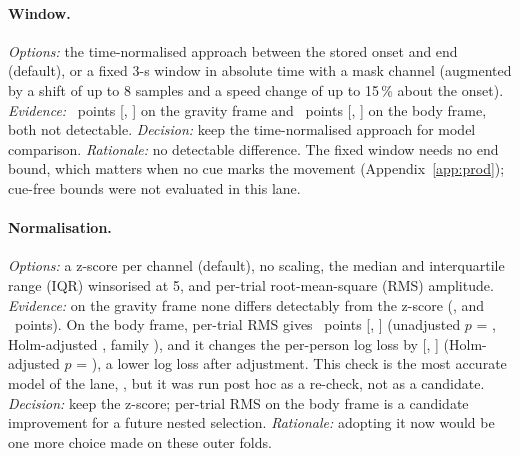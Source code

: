 \paragraph{Window.}
\emph{Options:} the time-normalised approach between the stored onset and end (default), or a fixed 3-s window in absolute time with a mask channel (augmented by a shift of up to 8 samples and a speed change of up to 15\,\% about the onset).
\emph{Evidence:} ~points [, ] on the gravity frame and ~points [, ] on the body frame, both not detectable.
\emph{Decision:} keep the time-normalised approach for model comparison.
\emph{Rationale:} no detectable difference. The fixed window needs no end bound, which matters when no cue marks the movement (Appendix~\ref{app:prod}); cue-free bounds were not evaluated in this lane.

\paragraph{Normalisation.}
\emph{Options:} a z-score per channel (default), no scaling, the median and interquartile range (IQR) winsorised at 5, and per-trial root-mean-square (RMS) amplitude.
\emph{Evidence:} on the gravity frame none differs detectably from the z-score (,  and ~points).
On the body frame, per-trial RMS gives ~points [, ] (unadjusted $p$ = , Holm-adjusted , family ), and it changes the per-person log loss by  [, ] (Holm-adjusted $p$ = ), a lower log loss after adjustment.
This check is the most accurate model of the lane, , but it was run post hoc as a re-check, not as a candidate.
\emph{Decision:} keep the z-score; per-trial RMS on the body frame is a candidate improvement for a future nested selection.
\emph{Rationale:} adopting it now would be one more choice made on these outer folds.

